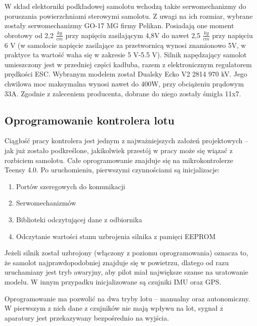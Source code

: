 \documentclass[12pt, a4paper]{article}
\begin{document}
W skład elektorniki podkładowej samolotu wchodzą także serwomechanizmy do poruszania powierzchniami sterowymi samolotu. Z uwagi na ich rozmiar, wybrane zostały serwomechanizmy GO-17 MG firmy Pelikan. Posiadają one moment obrotowy od 2,2 $\frac{kg}{cm}$ przy napięciu zasilającym 4,8V do nawet 2,5 $\frac{kg}{cm}$ przy napięciu 6 V (w samolocie napięcie zasilające za przetwornicą wynosi znamionowo 5V, w praktyce ta wartość waha się w zakresie 5 V-5.5 V). Silnik napędzający samolot umieszczony jest w przedniej części kadłuba, razem z elektronicznym regulatorem prędkości ESC. Wybranym modelem został Dualsky Ecko V2 2814 970 kV. Jego chwilowa moc maksymalna wynosi nawet do 400W, przy obciążeniu prądowym 33A. Zgodnie z zaleceniem producenta, dobrane do niego zostały śmigła 11x7.  

 \clearpage
\subsection{Oprogramowanie kontrolera lotu}
Ciągłość pracy kontrolera jest jednym z najważniejszych założeń projektowych – jak już zostało podkreślone, jakikolwiek przestój w pracy może się wiązać z rozbiciem samolotu. Całe oprogramowanie znajduje się na mikrokontrolerze Teensy 4.0. Po uruchomieniu, pierwszymi czynnościami są inicjalizacje:
\begin{enumerate}

\item Portów szeregowych do komunikacji
\item Serwomechanizmów 
\item Biblioteki odczytującej dane z odbiornika
\item Odczytanie wartości stanu uzbrojenia silnika z pamięci EEPROM

\end{enumerate}

Jeżeli silnik został uzbrojony (włączony z poziomu oprogramowania) oznacza to, że samolot najprawdopodobniej znajduje się w powietrzu, dlatego od razu uruchamiany jest tryb awaryjny, aby pilot miał największe szanse na uratowanie modelu. W innym przypadku inicjalizowane są czujniki IMU oraz GPS.

Oprogramowanie ma pozwolić na dwa tryby lotu – manualny oraz autonomiczny. W pierwszym z nich dane z czujników nie mają wpływu na lot, sygnał z aparatury jest przekazywany bezpośrednio na wyjścia.
 
\end{document}
